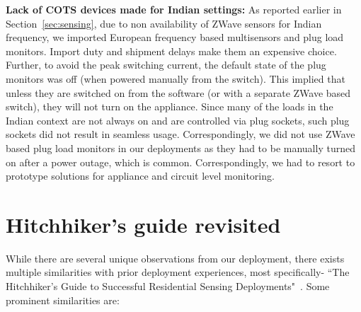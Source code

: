 \documentclass[10pt]{sensys-proc}
\newcommand{\secref}[1]{Section~\ref{#1}}
\begin{document}
\noindent \textbf{Lack of COTS devices made for Indian settings:} As reported earlier in \secref{sec:sensing}, due to non availability of ZWave sensors for Indian frequency, we imported European frequency based multisensors and plug load monitors. Import duty and shipment delays make them an expensive choice. Further, to avoid the peak switching current, the default state of the plug monitors was off (when powered manually from the switch). This implied that unless they are switched on from the software (or with a separate ZWave based switch), they will not turn on the appliance. Since many of the loads in the Indian context are not always on and are controlled via plug sockets, such plug sockets did not result in seamless usage. Correspondingly, we did not use ZWave based plug load monitors in our deployments as they had to be manually turned on after a power outage, which is common. %
Correspondingly, we had to resort to prototype solutions for appliance and circuit level monitoring.

\section{Hitchhiker's guide revisited}
\label{sec:common}
While there are several unique observations from our deployment, there exists multiple similarities with prior deployment experiences, most specifically- ``The Hitchhiker's Guide to Successful Residential Sensing Deployments"~\cite{hitchhiker_residential}. Some prominent similarities are:
\end{document}

